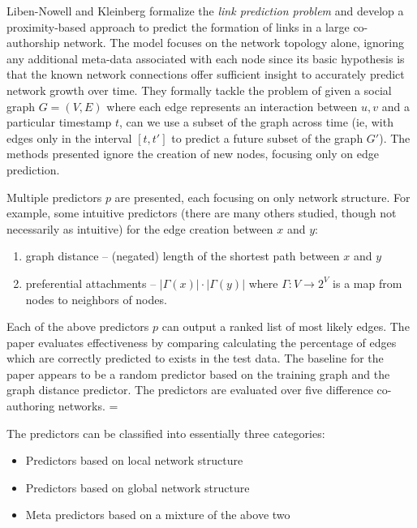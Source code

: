 \documentclass[letterpaper, 11 pt, conference]{ieeeconf}  %
\begin{document}
Liben-Nowell and Kleinberg \cite{TheLinkPredictionProblemForSocialNetworks} formalize the \textit{link prediction problem} and develop a proximity-based approach to predict the formation of links in a large co-authorship network. The model focuses on the network topology alone, ignoring any additional meta-data associated with each node since its basic hypothesis is that the known network connections offer sufficient insight to accurately predict network growth over time. They formally tackle the problem of given a social graph $G = (V,E)$ where each edge represents an interaction between $u,v$ and a particular timestamp $t$, can we use a subset of the graph across time (ie, with edges only in the interval $[t,t']$ to predict a future subset of the graph $G'$). The methods presented ignore the creation of new nodes, focusing only on edge prediction.

Multiple predictors $p$ are presented, each focusing on only network structure. For example, some intuitive predictors (there are many others studied, though not necessarily as intuitive) for the edge creation between $x$ and $y$:

\begin{enumerate}
\item graph distance -- (negated) length of the shortest path between $x$ and $y$
\item preferential attachments -- $|\Gamma(x)| \cdot |\Gamma(y)|$ where $\Gamma: V \to 2^V$ is a map from nodes to neighbors of nodes.
\end{enumerate}

Each of the above predictors $p$ can output a ranked list of most likely edges. The paper evaluates effectiveness by comparing calculating the percentage of edges which are correctly predicted to exists in the test data. The baseline for the paper appears to be a random predictor based on the training graph and the graph distance predictor. The predictors are evaluated over five difference co-authoring networks. =

The predictors can be classified into essentially three categories:

\begin{itemize}
\item Predictors based on local network structure
\item Predictors based on global network structure
\item Meta predictors based on a mixture of the above two 
\end{itemize}
\end{document}
